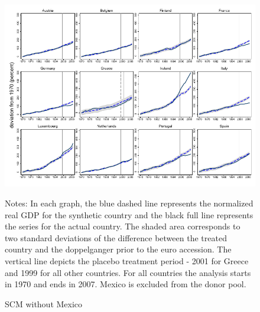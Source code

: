 \documentclass[12pt]{article}
\newcommand{\annote}[1]{\parbox{\textwidth}{\renewcommand{\baselinestretch}{1.0}\vspace{12pt} \small Notes: #1}}
\begin{document}
\begin{appendices}
\begin{figure}[h!]
    \centering
    \label{F_MEX}
    \caption{SCM without Mexico}
    \includegraphics[scale=0.7]{Output/Figures/SCM_gdp_Rob_1999_Annual_MEX.pdf}
         \annote{In each graph, the blue dashed line represents the normalized real GDP for the synthetic country and the black full line represents the series for the actual country. The shaded area corresponds to two standard deviations of the difference between the treated country and the doppelganger prior to the euro accession. The vertical line depicts the placebo treatment period - 2001 for Greece and 1999 for all other countries. For all countries the analysis starts in 1970 and ends in 2007. Mexico is excluded from the donor pool. }
\end{figure}


\end{appendices}
\end{document}
